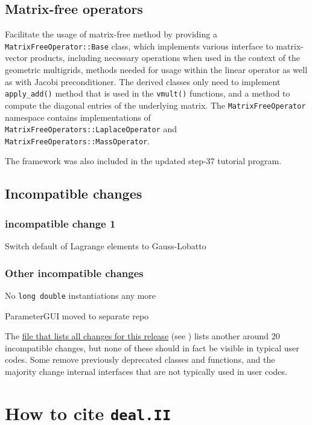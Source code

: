 \documentclass{ansarticle-preprint}
\newcommand{\specialword}[1]{\texttt{#1}}
\newcommand{\dealii}{{\specialword{deal.II}}}
\begin{document}
\subsection{Matrix-free operators}

Facilitate the usage of matrix-free method by providing a \verb!MatrixFreeOperator::Base! class,
which implements various interface to matrix-vector products, including necessary operations when used in
the context of the geometric multigrids, methods needed for usage within the linear operator as well as with Jacobi preconditioner.
The derived classes only need to implement \verb!apply_add()! method that is
used in the \verb!vmult()! functions, and a method to compute the diagonal entries of the underlying matrix.
The \verb!MatrixFreeOperator! namespace contains implementations of \verb!MatrixFreeOperators::LaplaceOperator! and
\verb!MatrixFreeOperators::MassOperator!.

The framework was also included in the updated step-37 tutorial program.

\subsection{Incompatible changes}

\subsubsection{incompatible change 1}

Switch default of Lagrange elements to Gauss-Lobatto

\subsubsection{Other incompatible changes}

No \texttt{long double} instantiations any more

ParameterGUI moved to separate repo

The
\href{https://www.dealii.org/8.5.0/doxygen/deal.II/changes_between_8_4_and_8_5.html}{file
  that lists all changes for this release} (see \cite{changes84})
lists another around 20
incompatible changes, but none of these should in fact be visible in
typical user codes. Some remove previously deprecated classes and
functions, and the majority change internal interfaces that are not
typically used in user codes.



\section{How to cite \dealii{}}\label{sec:cite}
\end{document}

